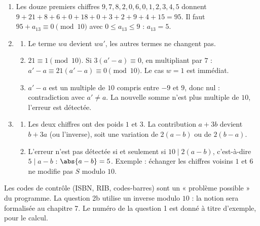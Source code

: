 \begin{solution}[Problème]
\begin{enumerate}
\item Les douze premiers chiffres $9,7,8,2,0,6,0,1,2,3,4,5$ donnent $9+21+8+6+0+18+0+3+2+9+4+15=95$. Il faut $95+a_{13}\equiv0\pmod{10}$ avec $0\le a_{13}\le9$ : $a_{13}=5$.
\item
\begin{enumerate}
\item Le terme $wa$ devient $wa'$, les autres termes ne changent pas.
\item $21\equiv1\pmod{10}$. Si $3(a'-a)\equiv0$, en multipliant par $7$ : $a'-a\equiv21(a'-a)\equiv0\pmod{10}$. Le cas $w=1$ est immédiat.
\item $a'-a$ est un multiple de $10$ compris entre $-9$ et $9$, donc nul : contradiction avec $a'\neq a$. La nouvelle somme n'est plus multiple de $10$, l'erreur est détectée.
\end{enumerate}
\item
\begin{enumerate}
\item Les deux chiffres ont des poids $1$ et $3$. La contribution $a+3b$ devient $b+3a$ (ou l'inverse), soit une variation de $2(a-b)$ ou de $2(b-a)$.
\item L'erreur n'est pas détectée si et seulement si $10\mid2(a-b)$, c'est-à-dire $5\mid a-b$ : $\abs{a-b}=5$. Exemple : échanger les chiffres voisins $1$ et $6$ ne modifie pas $S$ modulo $10$.
\end{enumerate}
\end{enumerate}
\end{solution}
\begin{teachernote}
Les codes de contrôle (ISBN, RIB, codes-barres) sont un « problème possible » du programme. La question 2b utilise un inverse modulo $10$ : la notion sera formalisée au chapitre 7. Le numéro de la question 1 est donné à titre d'exemple, pour le calcul.
\end{teachernote}
